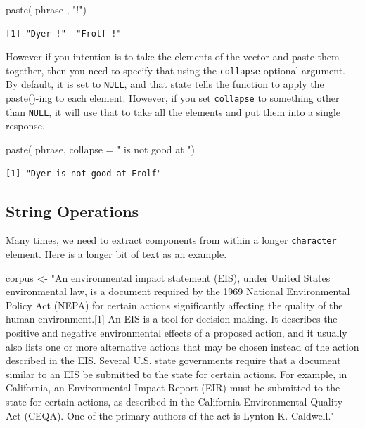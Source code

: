 \documentclass[
  letterpaper,
]{book}
\newenvironment{Shaded}{\begin{snugshade}}{\end{snugshade}}
\newcommand{\AttributeTok}[1]{\textcolor[rgb]{0.40,0.45,0.13}{#1}}
\newcommand{\FunctionTok}[1]{\textcolor[rgb]{0.28,0.35,0.67}{#1}}
\newcommand{\NormalTok}[1]{\textcolor[rgb]{0.00,0.23,0.31}{#1}}
\newcommand{\OtherTok}[1]{\textcolor[rgb]{0.00,0.23,0.31}{#1}}
\newcommand{\StringTok}[1]{\textcolor[rgb]{0.13,0.47,0.30}{#1}}
\begin{document}
\begin{Shaded}
\begin{Highlighting}[]
\FunctionTok{paste}\NormalTok{( phrase , }\StringTok{"!"}\NormalTok{)}
\end{Highlighting}
\end{Shaded}

\begin{verbatim}
[1] "Dyer !"  "Frolf !"
\end{verbatim}

However if you intention is to take the elements of the vector and paste
them together, then you need to specify that using the \texttt{collapse}
optional argument. By default, it is set to \texttt{NULL}, and that
state tells the function to apply the paste()-ing to each element.
However, if you set \texttt{collapse} to something other than
\texttt{NULL}, it will use that to take all the elements and put them
into a single response.

\begin{Shaded}
\begin{Highlighting}[]
\FunctionTok{paste}\NormalTok{( phrase, }\AttributeTok{collapse =} \StringTok{" is not good at "}\NormalTok{) }
\end{Highlighting}
\end{Shaded}

\begin{verbatim}
[1] "Dyer is not good at Frolf"
\end{verbatim}

\subsection{String Operations}\label{string-operations}

Many times, we need to extract components from within a longer
\texttt{character} element. Here is a longer bit of text as an example.

\begin{Shaded}
\begin{Highlighting}[]
\NormalTok{corpus }\OtherTok{\textless{}{-}} \StringTok{"An environmental impact statement (EIS), under United States environmental law, is a document required by the 1969 National Environmental Policy Act (NEPA) for certain actions \textquotesingle{}significantly affecting the quality of the human environment\textquotesingle{}.[1] An EIS is a tool for decision making. It describes the positive and negative environmental effects of a proposed action, and it usually also lists one or more alternative actions that may be chosen instead of the action described in the EIS. Several U.S. state governments require that a document similar to an EIS be submitted to the state for certain actions. For example, in California, an Environmental Impact Report (EIR) must be submitted to the state for certain actions, as described in the California Environmental Quality Act (CEQA). One of the primary authors of the act is Lynton K. Caldwell."}
\end{Highlighting}
\end{Shaded}
\end{document}
